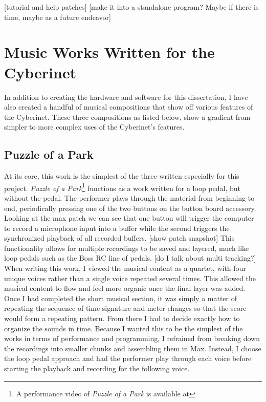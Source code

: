 [tutorial and help patches]
[make it into a standalone program? Maybe if there is time, maybe as a future endeavor]

\chapter{Music Works Written for the Cyberinet}

In addition to creating the hardware and software for this dissertation, I have also created a handful of musical compositions that show off various features of the Cyberinet. These three compositions as listed below, show a gradient from simpler to more complex uses of the Cyberinet’s features.

\section{Puzzle of a Park}
At its core, this work is the simplest of the three written especially for this project. \textit{Puzzle of a Park}\footnote{A performance video of \textit{Puzzle of a Park} is available at} functions as a work written for a loop pedal, but without the pedal. The performer plays through the material from beginning to end, periodically pressing one of the two buttons on the button board accessory. Looking at the max patch we can see that one button will trigger the computer to record a microphone input into a buffer while the second triggers the synchronized playback of all recorded buffers. 
[show patch snapshot]
This functionality allows for multiple recordings to be saved and layered, much like loop pedals such as the Boss RC line of pedals. [do I talk about multi tracking?]
When writing this work, I viewed the musical content as a quartet, with four unique voices rather than a single voice repeated several times. This allowed the musical content to flow and feel more organic once the final layer was added. 
Once I had completed the short musical section, it was simply a matter of repeating the sequence of time signature and meter changes so that the score would form a repeating pattern. From there I had to decide exactly how to organize the sounds in time. Because I wanted this to be the simplest of the works in terms of performance and programming, I refrained from breaking down the recordings into smaller chunks and assembling them in Max. Instead, I choose the loop pedal approach and had the performer play through each voice before starting the playback and recording for the following voice. 
